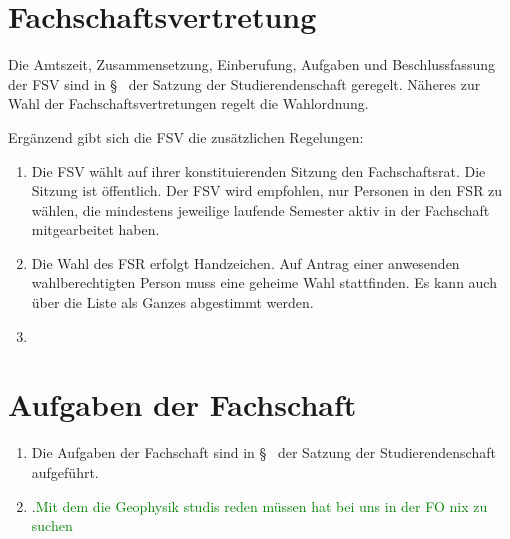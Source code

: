 \documentclass[
	a4paper,
	12pt,
	oneside,
	parskip=half-,
	pagesize,
	headsepline,
	german,
	ngerman
]{scrartcl}
\begin{document}
\section{Fachschaftsvertretung}
Die Amtszeit, Zusammensetzung, Einberufung, Aufgaben und Beschlussfassung der FSV sind in §~ der Satzung der Studierendenschaft geregelt. Näheres zur Wahl der Fachschaftsvertretungen regelt die Wahlordnung.

Ergänzend gibt sich die FSV die zusätzlichen Regelungen:
\begin{enumerate}
	\item Die FSV wählt auf ihrer konstituierenden Sitzung den Fachschaftsrat. Die Sitzung ist öffentlich. Der FSV wird empfohlen, nur Personen in den FSR zu wählen, die mindestens  jeweilige laufende Semester aktiv in der Fachschaft mitgearbeitet haben.
	\item Die Wahl des FSR erfolgt  Handzeichen. Auf Antrag einer anwesenden wahlberechtigten Person muss eine geheime Wahl stattfinden. Es kann auch über die Liste als Ganzes abgestimmt werden.
	\item {}
\end{enumerate}

\section{Aufgaben der Fachschaft}
\begin{enumerate}
	\item Die Aufgaben der Fachschaft sind in §~ der Satzung der Studierendenschaft aufgeführt.
	\item {}.\textcolor{green}{Mit dem die Geophysik studis reden müssen hat bei uns in der FO nix zu suchen}
\end{enumerate}
\end{document}
